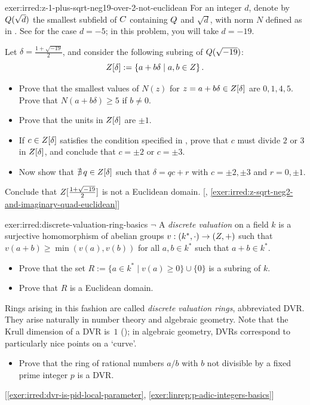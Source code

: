 \begin{exer}{}{exer:irred:z-1-plus-sqrt-neg19-over-2-not-euclidean}
  \exerused{} For an integer $d$, denote by $Q(\sqrt{d})$ the
  smallest subfield of $C$ containing $Q$ and $\sqrt{d}$, with norm
  $N$ defined as in . See
   for the case $d = -5$; in this
  problem, you will take $d = -19$.

  Let $\delta = \frac{1 + \sqrt{-19}}{2}$, and consider the following
  subring of $Q(\sqrt{-19})$:
  \[Z[\delta] := \left\{ a + b\delta \mid a, b \in Z
    \right\}.\]
  \begin{itemize}
  \item Prove that the smallest values of $N(z)$ for
    $z = a + b\delta \in Z[\delta]$ are $0, 1, 4, 5$. Prove that
    $N(a + b\delta) \geq 5$ if $b \neq 0$.
  \item Prove that the units in $Z[\delta]$ are $\pm 1$.
  \item If $c \in Z[\delta]$ satisfies the condition specified in
    , prove
    that $c$ must divide $2$ or $3$ in $Z[\delta]$, and conclude that
    $c = \pm 2$ or $c = \pm 3$.
  \item Now show that $\nexists\, q \in Z[\delta]$ such that
    $\delta = qc + r$ with $c = \pm 2, \pm 3$ and $r = 0, \pm 1$.
  \end{itemize}
  Conclude that $Z[\frac{1+\sqrt{-19}}{2}]$ is not a Euclidean
  domain. [,
  \ref{exer:irred:z-sqrt-neg2-and-imaginary-quad-euclidean}]
\end{exer}
\begin{exer}{}{exer:irred:discrete-valuation-ring-basics}
  $\lnot$ A \emph{discrete valuation} on a field $k$ is a surjective
  homomorphism of abelian groups $v : (k^*, \cdot) \to (Z, +)$ such
  that $v(a + b) \geq \min(v(a), v(b))$ for all $a, b \in k^*$ such
  that $a + b \in k^*$.
  \begin{itemize}
  \item Prove that the set
    $R := \{a \in k^* \mid v(a) \geq 0\} \cup \{0\}$ is a subring of
    $k$.
  \item Prove that $R$ is a Euclidean domain.
  \end{itemize}
  Rings arising in this fashion are called \emph{discrete valuation
    rings}, abbreviated DVR. They arise naturally in number theory and
  algebraic geometry. Note that the Krull dimension of a DVR is~$1$
  (); in algebraic
  geometry, DVRs correspond to particularly nice points on a `curve'.
  \begin{itemize}
  \item Prove that the ring of rational numbers $a/b$ with $b$ not
    divisible by a fixed prime integer $p$ is a DVR.
  \end{itemize} [\ref{exer:irred:dvr-is-pid-local-parameter},
  \ref{exer:linrep:p-adic-integers-basics}]
\end{exer}
